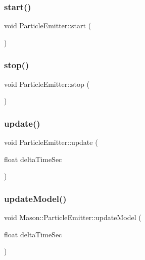 \subsubsection{\texorpdfstring{start()}{start()}}
{\footnotesize\ttfamily void Particle\+Emitter\+::start (\begin{DoxyParamCaption}{ }\end{DoxyParamCaption})}

\hypertarget{class_mason_1_1_particle_emitter_a4843aa3afd1c4d49c9c2519837fffe81}{}\label{class_mason_1_1_particle_emitter_a4843aa3afd1c4d49c9c2519837fffe81} 
\subsubsection{\texorpdfstring{stop()}{stop()}}
{\footnotesize\ttfamily void Particle\+Emitter\+::stop (\begin{DoxyParamCaption}{ }\end{DoxyParamCaption})}

\hypertarget{class_mason_1_1_particle_emitter_a34da56b84fe4810c701f4b1541e079dc}{}\label{class_mason_1_1_particle_emitter_a34da56b84fe4810c701f4b1541e079dc} 
\subsubsection{\texorpdfstring{update()}{update()}}
{\footnotesize\ttfamily void Particle\+Emitter\+::update (\begin{DoxyParamCaption}\item[{float}]{delta\+Time\+Sec }\end{DoxyParamCaption})}

\hypertarget{class_mason_1_1_particle_emitter_abc43ce83f1adef05e78b166422217cad}{}\label{class_mason_1_1_particle_emitter_abc43ce83f1adef05e78b166422217cad} 
\subsubsection{\texorpdfstring{update\+Model()}{updateModel()}}
{\footnotesize\ttfamily void Mason\+::\+Particle\+Emitter\+::update\+Model (\begin{DoxyParamCaption}\item[{float}]{delta\+Time\+Sec }\end{DoxyParamCaption})\hspace{0.3cm}{\ttfamily [protected]}}



